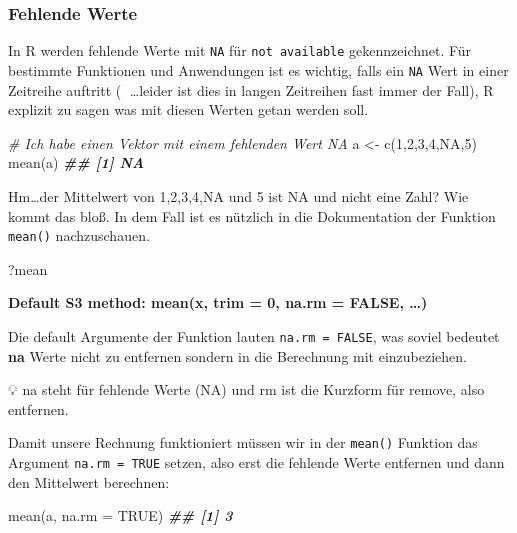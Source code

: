 \documentclass[
]{article}
\newenvironment{Shaded}{\begin{snugshade}}{\end{snugshade}}
\newcommand{\AttributeTok}[1]{\textcolor[rgb]{0.77,0.63,0.00}{#1}}
\newcommand{\CommentTok}[1]{\textcolor[rgb]{0.56,0.35,0.01}{\textit{#1}}}
\newcommand{\ConstantTok}[1]{\textcolor[rgb]{0.00,0.00,0.00}{#1}}
\newcommand{\DecValTok}[1]{\textcolor[rgb]{0.00,0.00,0.81}{#1}}
\newcommand{\DocumentationTok}[1]{\textcolor[rgb]{0.56,0.35,0.01}{\textbf{\textit{#1}}}}
\newcommand{\FunctionTok}[1]{\textcolor[rgb]{0.00,0.00,0.00}{#1}}
\newcommand{\NormalTok}[1]{#1}
\newcommand{\OtherTok}[1]{\textcolor[rgb]{0.56,0.35,0.01}{#1}}
\begin{document}
\hypertarget{fehlende-werte}{%
\subsubsection{Fehlende Werte}\label{fehlende-werte}}

In R werden fehlende Werte mit \texttt{NA} für \texttt{not\ available} gekennzeichnet. Für bestimmte Funktionen und Anwendungen ist es wichtig, falls ein \texttt{NA} Wert in einer Zeitreihe auftritt (🤯 \ldots leider ist dies in langen Zeitreihen fast immer der Fall), R explizit zu sagen was mit diesen Werten getan werden soll.

\begin{Shaded}
\begin{Highlighting}[]
\CommentTok{\# Ich habe einen Vektor mit einem fehlenden Wert NA}
\NormalTok{a }\OtherTok{\textless{}{-}} \FunctionTok{c}\NormalTok{(}\DecValTok{1}\NormalTok{,}\DecValTok{2}\NormalTok{,}\DecValTok{3}\NormalTok{,}\DecValTok{4}\NormalTok{,}\ConstantTok{NA}\NormalTok{,}\DecValTok{5}\NormalTok{)}
\FunctionTok{mean}\NormalTok{(a)}
\DocumentationTok{\#\# [1] NA}
\end{Highlighting}
\end{Shaded}

Hm\ldots der Mittelwert von 1,2,3,4,NA und 5 ist NA und nicht eine Zahl? Wie kommt das bloß. In dem Fall ist es nützlich in die Dokumentation der Funktion \texttt{mean()} nachzuschauen.

\begin{Shaded}
\begin{Highlighting}[]
\NormalTok{?mean}
\end{Highlighting}
\end{Shaded}

\textbf{Default S3 method: mean(x, trim = 0, na.rm = FALSE, \ldots)}

Die default Argumente der Funktion lauten \texttt{na.rm\ =\ FALSE}, was soviel bedeutet \textbf{na} Werte nicht zu entfernen sondern in die Berechnung mit einzubeziehen.

💡 na steht für fehlende Werte (NA) und rm ist die Kurzform für remove, also entfernen.

Damit unsere Rechnung funktioniert müssen wir in der \texttt{mean()} Funktion das Argument \texttt{na.rm\ =\ TRUE} setzen, also erst die fehlende Werte entfernen und dann den Mittelwert berechnen:

\begin{Shaded}
\begin{Highlighting}[]
\FunctionTok{mean}\NormalTok{(a, }\AttributeTok{na.rm =} \ConstantTok{TRUE}\NormalTok{)}
\DocumentationTok{\#\# [1] 3}
\end{Highlighting}
\end{Shaded}
\end{document}
